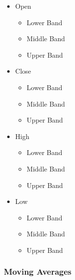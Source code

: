\documentclass[journal]{IEEEtran}
\begin{document}
\begin{itemize}
	\item Open
	\begin{itemize}
		\item Lower Band
		\item Middle Band
		\item Upper Band
	\end{itemize}
	\item Close
	\begin{itemize}
		\item Lower Band
		\item Middle Band
		\item Upper Band
	\end{itemize}
	\item High
	\begin{itemize}
		\item Lower Band
		\item Middle Band
		\item Upper Band
	\end{itemize}
	\item Low
	\begin{itemize}
		\item Lower Band
		\item Middle Band
		\item Upper Band
	\end{itemize}
\end{itemize}

\subsubsection{Moving Averages}
\end{document}
